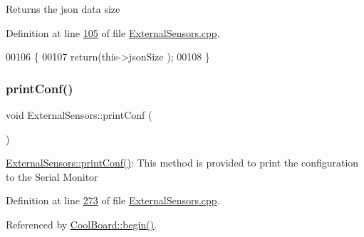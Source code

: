 \begin{DoxyReturn}{Returns}
the json data size 
\end{DoxyReturn}


Definition at line \hyperlink{_external_sensors_8cpp_source_l00105}{105} of file \hyperlink{_external_sensors_8cpp_source}{External\+Sensors.\+cpp}.


\begin{DoxyCode}
00106 \{
00107     \textcolor{keywordflow}{return}(this->jsonSize );
00108 \}
\end{DoxyCode}
\mbox{\label{class_external_sensors_a78c2bf55084435dd51d3c559b2d3c6f3}} 
\subsubsection{\texorpdfstring{print\+Conf()}{printConf()}}
{\footnotesize\ttfamily void External\+Sensors\+::print\+Conf (\begin{DoxyParamCaption}{ }\end{DoxyParamCaption})}

\hyperlink{class_external_sensors_a78c2bf55084435dd51d3c559b2d3c6f3}{External\+Sensors\+::print\+Conf()}\+: This method is provided to print the configuration to the Serial Monitor 

Definition at line \hyperlink{_external_sensors_8cpp_source_l00273}{273} of file \hyperlink{_external_sensors_8cpp_source}{External\+Sensors.\+cpp}.



Referenced by \hyperlink{_cool_board_8cpp_source_l00021}{Cool\+Board\+::begin()}.



